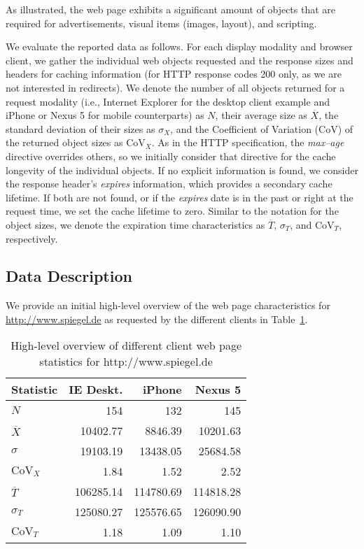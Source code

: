 As illustrated, the web page exhibits a significant amount of objects that are required for advertisements, visual items (images, layout), and scripting.

We evaluate the reported data as follows. 
For each display modality and browser client, we gather the individual web objects requested and the response sizes and headers for caching information (for HTTP response codes 200 only, as we are not interested in redirects).
We denote the number of all objects returned for a request modality (i.e., Internet Explorer for the desktop client example and iPhone or Nexus 5 for mobile counterparts) as $N$, their average size as $\overline{X}$, the standard deviation of their sizes as ${\sigma}_{X}$, and the Coefficient of Variation (CoV) of the returned object sizes as $\mathrm{CoV}_{X}$. 
As in the HTTP specification, the \emph{max--age} directive overrides others, so we initially consider that directive for the cache longevity of the individual objects. 
If no explicit information is found, we consider the response header's \emph{expires} information, which provides a secondary cache lifetime. 
If both are not found, or if the \emph{expires} date is in the past or right at the request time, we set the cache lifetime to zero. 
Similar to the notation for the object sizes, we denote the expiration time characteristics as $\overline{T}$, $\sigma_{T}$, and $\mathrm{CoV}_{T}$, respectively.

\subsection*{Data Description}

We provide an initial high-level overview of the web page characteristics for \url{http://www.spiegel.de} as requested by the different clients in Table~\ref{tab:spiegel}.
\begin{table}
\centering
\caption{High-level overview of different client web page statistics for http://www.spiegel.de}
\label{tab:spiegel}
\begin{tabular}{|l|r|r|r|}
	\hline
	Statistic          & IE Deskt. &    iPhone &   Nexus 5 \\ \hline
	$N$                &       154 &       132 &       145 \\ \hline\hline
	$\overline{X}$     &  10402.77 &   8846.39 &  10201.63 \\ \hline
	$\sigma$           &  19103.19 &  13438.05 &  25684.58 \\ \hline
	$\mathrm{CoV}_{X}$ &      1.84 &      1.52 &      2.52 \\ \hline\hline
	$\overline{T}$     & 106285.14 & 114780.69 & 114818.28 \\ \hline
	$\sigma_{T}$       & 125080.27 & 125576.65 & 126090.90 \\ \hline
	$\mathrm{CoV}_{T}$ &      1.18 &      1.09 &      1.10 \\ \hline
\end{tabular}
\end{table}

